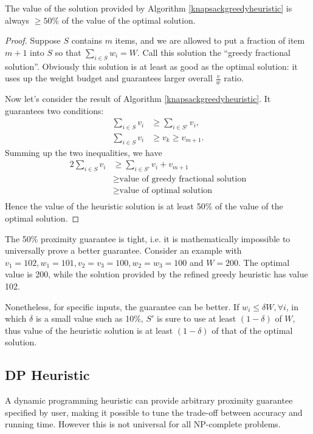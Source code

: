 The value of the solution provided by Algorithm \ref{knapsackgreedyheuristic} is always $\geq 50\%$ of the value of the optimal solution.
\begin{proof}
Suppose $S$ contains $m$ items, and we are allowed to put a fraction of item $m+1$ into $S$ so that $\sum_{i\in S}w_i=W$. Call this solution the ``greedy fractional solution''. Obviously this solution is at least as good as the optimal solution: it uses up the weight budget and guarantees larger overall $\frac{v}{w}$ ratio. 

Now let's consider the result of Algorithm \ref{knapsackgreedyheuristic}. It guarantees two conditions: 
\begin{align*}
\sum_{i\in S}v_i&\geq\sum_{i\in S'}v_i,\\
\sum_{i\in S}v_i&\geq v_k\geq v_{m+1}.
\end{align*}
Summing up the two inequalities, we have 
\begin{align*}
2\sum_{i\in S}v_i&\geq\sum_{i\in S'}v_i+v_{m+1}\\
&\geq\text{value of greedy fractional solution}\\
&\geq\text{value of optimal solution}\\
\end{align*}
Hence the value of the heuristic solution is at least 50\% of the value of the optimal solution.
\end{proof}
The 50\% proximity guarantee is tight, i.e. it is mathematically impossible to universally prove a better guarantee. Consider an example with $v_1=102,w_1=101,v_2=v_3=100,w_2=w_3=100$ and $W=200$. The optimal value is 200, while the solution provided by the refined greedy heuristic has value 102. 

Nonetheless, for specific inputs, the guarantee can be better. If $w_i\leq\delta W,\forall i$, in which $\delta$ is a small value such as 10\%, $S'$ is sure to use at least $(1-\delta)$ of $W$, thus value of the heuristic solution is at least $(1-\delta)$ of that of the optimal solution.
\subsection{DP Heuristic}
A dynamic programming heuristic can provide arbitrary proximity guarantee specified by user, making it possible to tune the trade-off between accuracy and running time. However this is not universal for all NP-complete problems.

